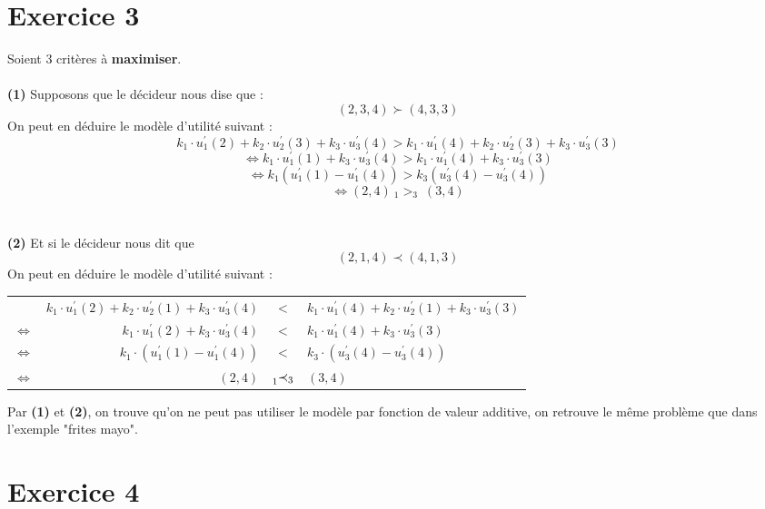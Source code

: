\documentclass[a4paper, 12pt]{article}
\newcommand*{\stricpref}{\prec}
\newcommand*{\stricprefchange}[2]{\prescript{}{#1}{\stricpref}_{#2}}
\begin{document}
	\section*{Exercice 3}
		Soient 3 critères à \textbf{maximiser}.\\
		~\\
		\textbf{(1)} Supposons que le décideur nous dise que :
		$$ (2, 3, 4) \succ (4, 3, 3) $$
		On peut en déduire le modèle d'utilité suivant :
		$$ k_1 \cdot u^{'}_{1}(2) + k_2 \cdot u^{'}_{2}(3) + 
		   k_3 \cdot u^{'}_{3}(4) >
		   k_1 \cdot u^{'}_{1}(4) + k_2 \cdot u^{'}_{2}(3) + 
		   k_3 \cdot u^{'}_{3}(3) $$
		$$ \Leftrightarrow 
		   k_1 \cdot u^{'}_{1}(1) + k_3 \cdot u^{'}_{3}(4) >
		   k_1 \cdot u^{'}_{1}(4) + k_3 \cdot u^{'}_{3}(3) $$
		$$ \Leftrightarrow 
		   k_1 (u^{'}_{1}(1) - u^{'}_{1}(4)) > 
		   k_3 (u^{'}_{3}(4) - u^{'}_{3}(4)) $$
		$$ \Leftrightarrow 
		   (2, 4)\ _1>_3\ (3, 4) $$
		\\~\\
		\textbf{(2)} Et si le décideur nous dit que 
		$$ (2, 1, 4) \stricpref (4, 1, 3) $$
		On peut en déduire le modèle d'utilité suivant :
		\begin{center}
		\begin{tabular}{crcl}
		& $k_1 \cdot u^{'}_{1}(2) + k_2 \cdot u^{'}_{2}(1) + k_3 \cdot u^{'}_{3}(4)$ & $<$ &
		   $k_1 \cdot u^{'}_{1}(4) + k_2 \cdot u^{'}_{2}(1) + k_3 \cdot u^{'}_{3}(3) $ \\
		$\Leftrightarrow$ & $k_1 \cdot u^{'}_{1}(2) + k_3 \cdot u^{'}_{3}(4)$ & $<$ &
			$k_1 \cdot u^{'}_{1}(4) + k_3 \cdot u^{'}_{3}(3)$ \\
		$\Leftrightarrow$ & $k_1 \cdot (u^{'}_{1}(1) - u^{'}_{1}(4))$ & $<$ & 
			$k_3 \cdot (u^{'}_{3}(4) - u^{'}_{3}(4))$ \\
		$\Leftrightarrow$ & $(2, 4)$ & $\stricprefchange{1}{3}$ & $(3, 4)$
		\end{tabular}
		\end{center}
		Par \textbf{(1)} et \textbf{(2)}, on trouve qu'on ne peut pas
		utiliser le modèle par fonction de valeur
		additive, on retrouve le même problème que dans l'exemple 
		"frites mayo".
	\section*{Exercice 4}
\end{document}
